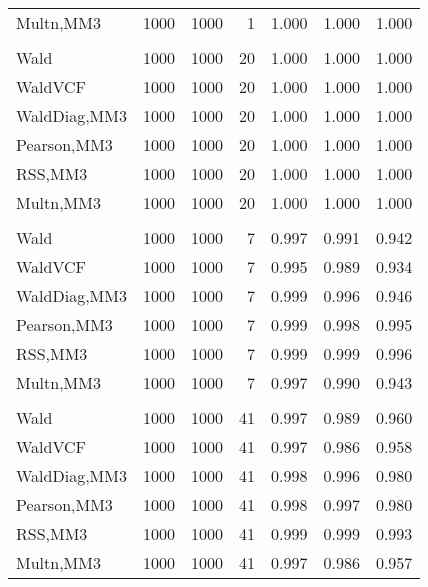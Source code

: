 \documentclass[
]{article}
\begin{document}
\begin{table}[H]
{\begin{tabular}[t]{lrrrrrr}
\hspace{1em}Multn,MM3 & 1000 & 1000 & 1 & 1.000 & 1.000 & 1.000\\
\addlinespace[0.3em]
\multicolumn{7}{l}{\textbf{1F 15V}}\\
\hspace{1em}Wald & 1000 & 1000 & 20 & 1.000 & 1.000 & 1.000\\
\hspace{1em}WaldVCF & 1000 & 1000 & 20 & 1.000 & 1.000 & 1.000\\
\hspace{1em}WaldDiag,MM3 & 1000 & 1000 & 20 & 1.000 & 1.000 & 1.000\\
\hspace{1em}Pearson,MM3 & 1000 & 1000 & 20 & 1.000 & 1.000 & 1.000\\
\hspace{1em}RSS,MM3 & 1000 & 1000 & 20 & 1.000 & 1.000 & 1.000\\
\hspace{1em}Multn,MM3 & 1000 & 1000 & 20 & 1.000 & 1.000 & 1.000\\
\addlinespace[0.3em]
\multicolumn{7}{l}{\textbf{2F 10V}}\\
\hspace{1em}Wald & 1000 & 1000 & 7 & 0.997 & 0.991 & 0.942\\
\hspace{1em}WaldVCF & 1000 & 1000 & 7 & 0.995 & 0.989 & 0.934\\
\hspace{1em}WaldDiag,MM3 & 1000 & 1000 & 7 & 0.999 & 0.996 & 0.946\\
\hspace{1em}Pearson,MM3 & 1000 & 1000 & 7 & 0.999 & 0.998 & 0.995\\
\hspace{1em}RSS,MM3 & 1000 & 1000 & 7 & 0.999 & 0.999 & 0.996\\
\hspace{1em}Multn,MM3 & 1000 & 1000 & 7 & 0.997 & 0.990 & 0.943\\
\addlinespace[0.3em]
\multicolumn{7}{l}{\textbf{3F 15V}}\\
\hspace{1em}Wald & 1000 & 1000 & 41 & 0.997 & 0.989 & 0.960\\
\hspace{1em}WaldVCF & 1000 & 1000 & 41 & 0.997 & 0.986 & 0.958\\
\hspace{1em}WaldDiag,MM3 & 1000 & 1000 & 41 & 0.998 & 0.996 & 0.980\\
\hspace{1em}Pearson,MM3 & 1000 & 1000 & 41 & 0.998 & 0.997 & 0.980\\
\hspace{1em}RSS,MM3 & 1000 & 1000 & 41 & 0.999 & 0.999 & 0.993\\
\hspace{1em}Multn,MM3 & 1000 & 1000 & 41 & 0.997 & 0.986 & 0.957\\
\bottomrule
\end{tabular}}
\endgroup{}
\end{table}
\end{document}
